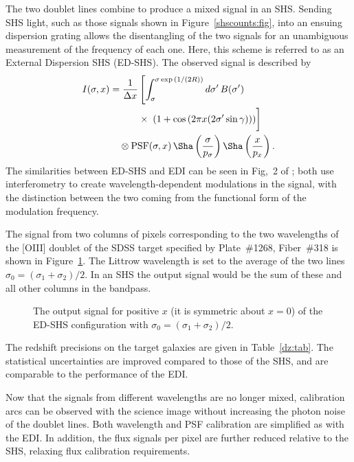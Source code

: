 \documentclass[preprint2, 10pt]{aastex}
\begin{document}
The two doublet lines combine to produce a mixed signal in an SHS.  Sending SHS light, such as those signals shown
in  Figure~\ref{shscounts:fig}, into an ensuing dispersion grating
allows the disentangling of the two signals for an unambiguous measurement of the frequency of each one.  Here, 
this scheme is 
referred to as an External Dispersion SHS (ED-SHS).
The observed signal is described by
\begin{align}
I(\sigma,x) &= \frac{1}{\Delta x}\left[\int^{\sigma \exp{\left(1/(2R)\right)}}_{\sigma} d\sigma'\,B(\sigma') \right.\nonumber\\ 
& \quad\qquad \times \left.\vphantom{\int_{0}^{\infty}} \left(1+\cos{\left(2 \pi x (2\sigma' \sin{\gamma})\right)}\right) \right] \nonumber\\ 
& \quad \otimes \mbox{PSF}(\sigma,x)\, \Sha\left(\frac{\sigma}{p_\sigma}\right) \Sha\left(\frac{x}{p_x}\right).
\label{edishssig:eqn}
\end{align}
The similarities between ED-SHS and EDI can be seen in Fig,\ 2 of \citet{2003PASP..115..255E}; both use
interferometry to create wavelength-dependent modulations in the signal, with the distinction between the two coming
from the functional form of
the modulation frequency.


The signal from two columns of pixels corresponding to the two wavelengths of
the [OIII] doublet of the
SDSS target specified by Plate~\#1268, Fiber~\#318 is shown in Figure~\ref{edshs:fig}.
The Littrow wavelength is set to the average of the two lines  $\sigma_0=(\sigma_1+\sigma_2)/2$.
In an SHS the output signal would be the sum of these and all other columns in the bandpass.


\begin{figure}[t]
   \centering
   \caption{The output signal for positive $x$ (it is symmetric about
$x=0$) of the ED-SHS configuration with 
    $\sigma_0=(\sigma_1+\sigma_2)/2$. 
\label{edshs:fig}}
\end{figure} 


The redshift precisions on the target galaxies are given in Table~\ref{dz:tab}.  The statistical uncertainties are improved compared to those of the
SHS, and are comparable to the performance of the EDI.

Now that the signals from different wavelengths are no longer mixed, calibration arcs can be observed with the science image without increasing
the photon noise of the doublet lines.  Both wavelength and PSF calibration are simplified as with the EDI.
In addition, the flux signals per pixel are further reduced relative to the SHS, relaxing flux calibration requirements. 
\end{document}
